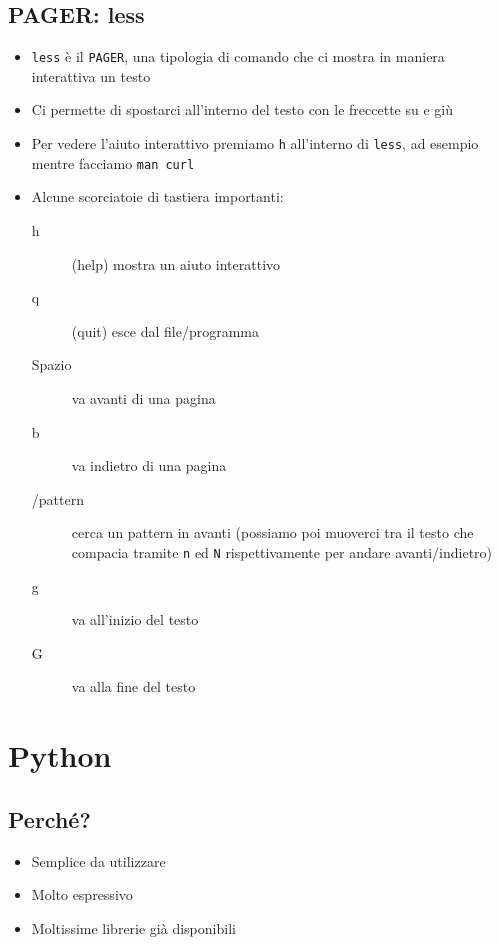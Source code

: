 \documentclass{beamer}
\newcommand{\command}[1]{\mbox{\texttt{#1}}}
\begin{document}
\subsection*{PAGER: less}
\begin{frame}{\insertsubsection}
\begin{itemize}
\item \command{less} è il \command{PAGER}, una tipologia di comando che ci
mostra in maniera interattiva un testo
\item Ci permette di spostarci all'interno del testo con le freccette su e giù
\item Per vedere l'aiuto interattivo premiamo \command{h} all'interno di
\command{less}, ad esempio mentre facciamo \command{man curl}
\item Alcune scorciatoie di tastiera importanti:
\begin{description}
\item[h] (help) mostra un aiuto interattivo
\item[q] (quit) esce dal file/programma
\item[Spazio] va avanti di una pagina
\item[b] va indietro di una pagina
\item[/pattern] cerca un pattern in avanti (possiamo poi muoverci tra
il testo che compacia tramite \command{n} ed \command{N}
rispettivamente per andare avanti/indietro)
\item[g] va all'inizio del testo
\item[G] va alla fine del testo
\end{description}
\end{itemize}
\end{frame}

\section{Python}
\begin{frame}{\insertsection}
\end{frame}

\subsection*{Perché?}
\begin{frame}{\insertsubsection}
\begin{itemize}
\item Semplice da utilizzare
\item Molto espressivo
\item Moltissime librerie già disponibili
\end{itemize}
\end{frame}
\end{document}
